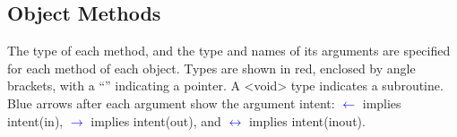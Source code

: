 



\subsection{Object Methods}

The type of each method, and the type and names of its arguments are specified for each method of each object. Types are shown in red, enclosed by angle brackets, with a ``{\normalfont \ttfamily *}'' indicating a pointer. A {\normalfont \ttfamily \textless void\textgreater} type indicates a subroutine. Blue arrows after each argument show the argument intent: \textcolor{blue}{$\leftarrow$} implies {\normalfont \ttfamily intent(in)},  \textcolor{blue}{$\rightarrow$} implies {\normalfont \ttfamily intent(out)}, and \textcolor{blue}{$\leftrightarrow$} implies {\normalfont \ttfamily intent(inout)}.



